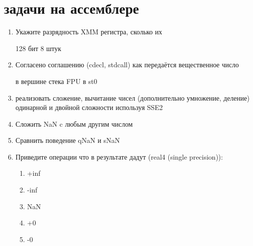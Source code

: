 \documentclass[a4paper,10pt]{article}
\begin{document}
\newpage
\section*{задачи на ассемблере}
\begin{enumerate}
    \item Укажите разрядность XMM регистра, сколько их \par
    128 бит 8 штук
    \item Согласено соглашению (cdecl, stdcall) как передаётся вещественное число\par
    в вершине стека FPU в st0
    \item реализовать сложение, вычитание чисел (дополнительно умножение, деление) одинарной и двойной сложности используя SSE2
    \item Сложить NaN c любым другим числом
    \item Сравнить поведение qNaN и sNaN
    \item Приведите операции что в результате дадут (real4 (single precision)):
    \begin{enumerate}
        \item +inf
        \item -inf
        \item NaN
        \item +0
        \item -0
    \end{enumerate}
\end{enumerate}
\end{document}
